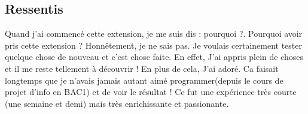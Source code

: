 \subsection{Ressentis}
\begin{flushleft}
Quand j'ai commencé cette extension, je me suis dis : pourquoi ?. Pourquoi avoir pris cette extension ? Honnêtement, je ne sais pas. Je voulais certainement tester quelque chose de nouveau et c'est chose faite. En effet, J'ai appris plein de choses et il me reste tellement à découvrir ! En plus de cela, J'ai adoré. Ca faisait longtemps que je n'avais jamais autant aimé programmer(depuis le cours de projet d'info en BAC1) et de voir le résultat ! Ce fut une expérience très courte (une semaine et demi) mais très enrichissante et passionante.  
\end{flushleft}